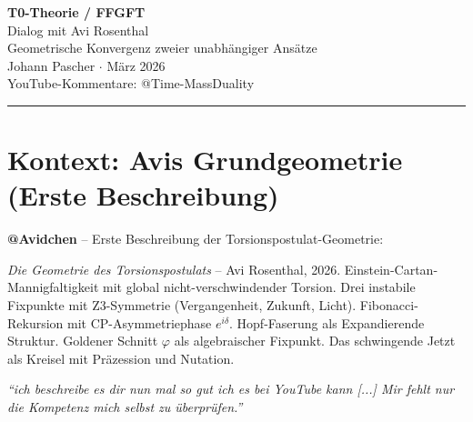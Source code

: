 \documentclass[12pt, a4paper]{article}
\begin{document}
\begin{center}
  {\LARGE\bfseries\color{T0blue} T0-Theorie / FFGFT}\\[0.5em]
  {\large Dialog mit Avi Rosenthal}\\[0.3em]
  {\large Geometrische Konvergenz zweier unabhängiger Ansätze}\\[1em]
  {\normalsize Johann Pascher \quad $\cdot$ \quad März 2026}\\[0.5em]
  {\small YouTube-Kommentare: @Time-MassDuality}
\end{center}

\vspace{1em}
\hrule
\vspace{1em}

\begin{abstract}
Dieses Dokument sammelt den wissenschaftlichen Dialog zwischen der T0-Theorie / Fundamentalen Fraktalen Geometrischen Feldtheorie (FFGFT) und dem Geometrieprogramm von Avi Rosenthal (2026). Beide Ansätze konvergieren unabhängig auf dieselben mathematischen Strukturen: fraktale Selbstähnlichkeit, Torus-Topologie, Fibonacci-Dynamik, goldener Schnitt als geometrischer Attraktor, und die Ableitbarkeit physikalischer Parameter aus einer einzigen geometrischen Quelle. Der Dialog dokumentiert die schrittweise Identifikation von Berührungspunkten und offenen Forschungsfragen.
\end{abstract}

\tableofcontents
\newpage

\section{Kontext: Avis Grundgeometrie (Erste Beschreibung)}

\begin{avipost}
\textbf{@Avidchen} -- Erste Beschreibung der Torsionspostulat-Geometrie:

\medskip
\textit{Die Geometrie des Torsionspostulats} -- Avi Rosenthal, 2026.
Einstein-Cartan-Mannigfaltigkeit mit global nicht-verschwindender Torsion. Drei instabile Fixpunkte mit Z3-Symmetrie (Vergangenheit, Zukunft, Licht). Fibonacci-Rekursion mit CP-Asymmetriephase $e^{i\delta}$. Hopf-Faserung als Expandierende Struktur. Goldener Schnitt $\varphi$ als algebraischer Fixpunkt. Das schwingende Jetzt als Kreisel mit Präzession und Nutation.

\medskip
\textit{``ich beschreibe es dir nun mal so gut ich es bei YouTube kann [...] Mir fehlt nur die Kompetenz mich selbst zu überprüfen.''}
\end{avipost}
\end{document}
